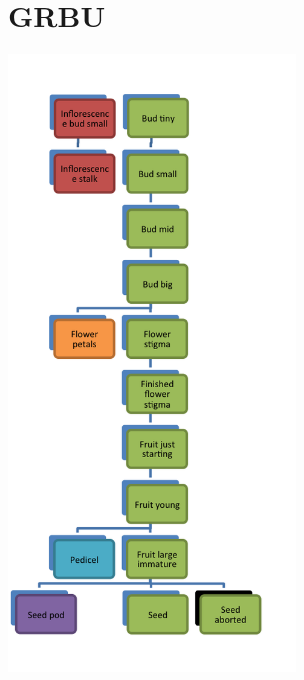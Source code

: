 \documentclass[10pt]{book} %
\begin{document}
\clearpage
\newpage


\section{GRBU}
\begin{multicols}{2}
\includegraphics[width=3in]{GRBU.png}
\vfill
\columnbreak

\\

\end{multicols}

\clearpage
\newpage
\end{document}
